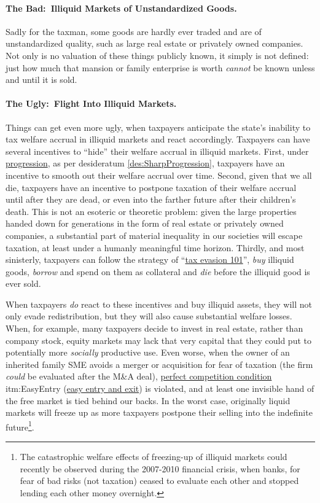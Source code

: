 \paragraph{The Bad:~Illiquid Markets of Unstandardized Goods.} Sadly for the taxman, some goods are hardly ever traded and are of unstandardized quality, such as large real estate or privately owned companies.
Not only is no valuation of these things publicly known, it simply is not defined:
just how much that mansion or family enterprise is worth \emph{cannot} be known unless and until it is sold.

\paragraph{The Ugly:~Flight Into Illiquid Markets.}  \label{sec:FreezingUp} Things can get even more ugly, when taxpayers anticipate the state's inability to tax welfare accrual in illiquid markets and react accordingly.
Taxpayers can have several incentives to ``hide'' their welfare accrual in illiquid markets.
First, under \href{des:SharpProgression}{progression}, as per desideratum \ref{des:SharpProgression}, taxpayers have an incentive to smooth out their welfare accrual over time.
Second, given that we all die, taxpayers have an incentive to postpone taxation of their welfare accrual until after they are dead, or even into the farther future after their children's death.
This is not an esoteric or theoretic problem:
given the large properties handed down for generations in the form of real estate or privately owned companies, a substantial part of material inequality in our societies will escape taxation, at least under a humanly meaningful time horizon.
Thirdly, and most sinisterly, taxpayers can follow the strategy of ``\href{sec:Evasion101}{tax evasion 101}'', \emph{buy} illiquid goods, \emph{borrow} and spend on them as collateral and \emph{die} before the illiquid good is ever sold.

When taxpayers \emph{do} react to these incentives and buy illiquid assets, they will not only evade redistribution, but they will also cause substantial welfare losses.
When, for example, many taxpayers decide to invest in real estate, rather than company stock, equity markets may lack that very capital that they could put to potentially more \emph{socially} productive use.
Even worse, when the owner of an inherited family SME avoids a merger or acquisition for fear of taxation (the firm \emph{could} be evaluated after the M\&A deal), \href{sec:PerfectCompetition}{perfect competition condition} {itm:EasyEntry} (\hyperref[itm:EasyEntry]{easy entry and exit}) is violated, and at least one invisible hand of the free market is tied behind our backs.
In the worst case, originally liquid markets will freeze up as more taxpayers postpone their selling into the indefinite future\footnote{The catastrophic welfare effects of freezing-up of illiquid markets could recently be observed during the 2007-2010 financial crisis, when banks, for fear of bad risks (not taxation) ceased to evaluate each other and stopped lending each other money overnight.}.

